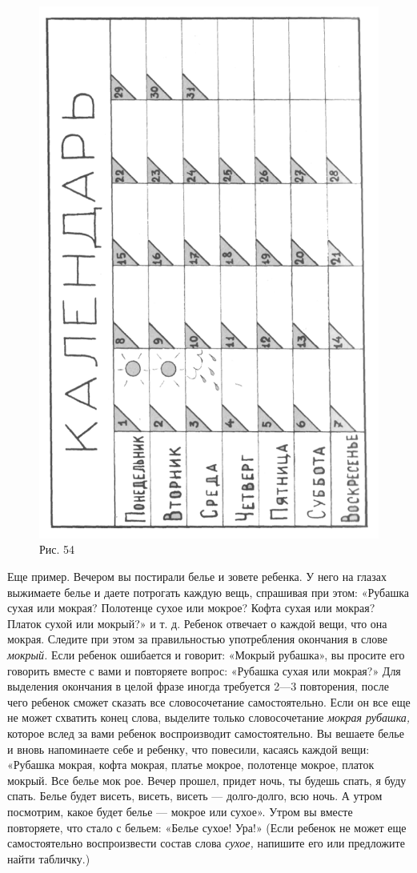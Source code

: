\documentclass[a5paper]{book}
\renewcommand{\emph}[1]{\textit{#1}}
\begin{document}
\begin{figure}
\centering
\includegraphics[width=0.9\linewidth]{media/media/image50.png}
\caption*{Рис. 54}
\end{figure}

Еще пример. Вечером вы постирали белье и зовете ребенка. У него на
глазах выжимаете белье и даете потрогать каждую вещь, спрашивая при
этом: «Рубашка сухая или мокрая? Полотенце сухое или мокрое? Кофта сухая
или мокрая? Платок сухой или мокрый?» и т. д. Ребенок отвечает о каждой
вещи, что она мокрая. Следите при этом за правильностью употребления
окончания в слове \emph{мокрый.} Если ребенок ошибается и говорит:
«Мокрый рубашка», вы просите его говорить вместе с вами и повторяете
вопрос: «Рубашка сухая или мокрая?» Для выделения окончания в целой
фразе иногда требуется 2---3 повторения, после чего ребенок сможет
сказать все словосочетание самостоятельно. Если он все еще не может
схватить конец слова, выделите только словосочетание \emph{мокрая
рубашка,} которое вслед за вами ребенок воспроизводит самостоятельно. Вы
вешаете белье и вновь напоминаете себе и ребенку, что повесили, касаясь
каждой вещи: «Рубашка мокрая, кофта мокрая, платье мокрое, полотенце
мокрое, платок мокрый. Все белье мок рое. Вечер прошел, придет ночь, ты
будешь спать, я буду спать. Белье будет висеть, висеть, висеть ---
долго-долго, всю ночь. А утром посмотрим, какое будет белье --- мокрое
или сухое». Утром вы вместе повторяете, что стало с бельем: «Белье
сухое! Ура!» (Если ребенок не может еще самостоятельно воспроизвести
состав слова \emph{сухое,} напишите его или предложите найти табличку.)
\end{document}
